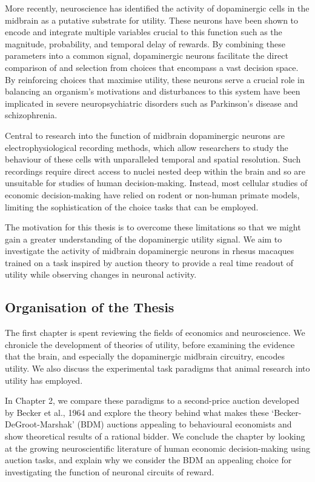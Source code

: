 \begin{summary}
More recently, neuroscience has identified the activity of dopaminergic cells in the midbrain as a putative substrate for utility. These neurons have been shown to encode and integrate multiple variables crucial to this function such as the magnitude, probability, and temporal delay of rewards. By combining these parameters into a common signal, dopaminergic neurons facilitate the direct comparison of and selection from choices that encompass a vast decision space. By reinforcing choices that maximise utility, these neurons serve a crucial role in balancing an organism’s motivations and disturbances to this system have been implicated in severe neuropsychiatric disorders such as Parkinson’s disease and schizophrenia.

Central to research into the function of midbrain dopaminergic neurons are electrophysiological recording methods, which allow researchers to study the behaviour of these cells with unparalleled temporal and spatial resolution. Such recordings require direct access to nuclei nested deep within the brain and so are unsuitable for studies of human decision-making. Instead, most cellular studies of economic decision-making have relied on rodent or non-human primate models, limiting the sophistication of the choice tasks that can be employed.

The motivation for this thesis is to overcome these limitations so that we might gain a greater understanding of the dopaminergic utility signal. We aim to investigate the activity of midbrain dopaminergic neurons in rhesus macaques trained on a task inspired by auction theory to provide a real time readout of utility while observing changes in neuronal activity.

\subsection*{Organisation of the Thesis}

The first chapter is spent reviewing the fields of economics and neuroscience. We chronicle the development of theories of utility, before examining the evidence that the brain, and especially the dopaminergic midbrain circuitry, encodes utility. We also discuss the experimental task paradigms that animal research into utility has employed.

In Chapter 2, we compare these paradigms to a second-price auction developed by Becker et al., 1964 and explore the theory behind what makes these ‘Becker-DeGroot-Marshak’ (BDM) auctions appealing to behavioural economists and show theoretical results of a rational bidder. We conclude the chapter by looking at the growing neuroscientific literature of human economic decision-making using auction tasks, and explain why we consider the BDM an appealing choice for investigating the function of neuronal circuits of reward. 


\end{summary}
